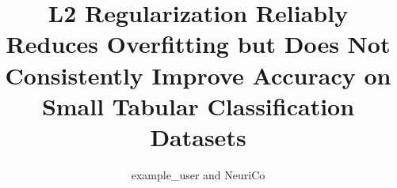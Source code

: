 \documentclass{article}
\title{L2 Regularization Reliably Reduces Overfitting but Does Not Consistently Improve Accuracy on Small Tabular Classification Datasets}
\author{example\_user and NeuriCo}
\begin{document}
\maketitle

\begin{abstract}

\end{abstract}









\end{document}
